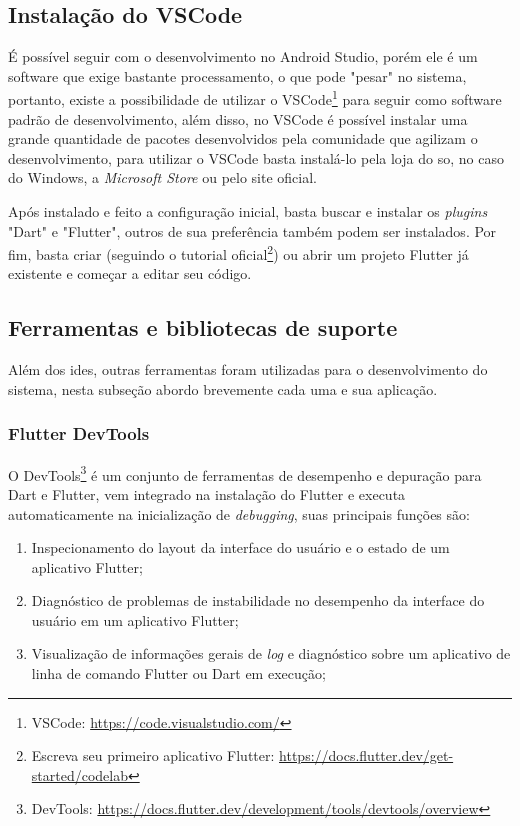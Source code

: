 \subsection{Instalação do VSCode}\label{ssec:instalacao_vscode}
É possível seguir com o desenvolvimento no Android Studio, porém ele é um software que exige bastante processamento, o que pode "pesar" no sistema, portanto, existe a possibilidade de utilizar o VSCode\footnote{\label{vscode}VSCode: \url{https://code.visualstudio.com/}} para seguir como software padrão de desenvolvimento, além disso, no VSCode é possível instalar uma grande quantidade de pacotes desenvolvidos pela comunidade que agilizam o desenvolvimento, para utilizar o VSCode basta instalá-lo pela loja do \ac{so}, no caso do Windows, a \textit{Microsoft Store} ou pelo site oficial. 

Após instalado e feito a configuração inicial, basta buscar e instalar os \textit{plugins} "Dart" e "Flutter", outros de sua preferência também podem ser instalados. Por fim, basta criar (seguindo o tutorial oficial\footnote{\label{create_app}Escreva seu primeiro aplicativo Flutter: \url{https://docs.flutter.dev/get-started/codelab}}) ou abrir um projeto Flutter já existente e começar a editar seu código.

\subsection{Ferramentas e bibliotecas de suporte}\label{ssec:ferramentas}
Além dos \acp{ide}, outras ferramentas foram utilizadas para o desenvolvimento do sistema, nesta subseção abordo brevemente cada uma e sua aplicação.
\subsubsection{Flutter DevTools}\label{sssec:flutter_devtools}
O DevTools\footnote{\label{dev_tools}DevTools: \url{https://docs.flutter.dev/development/tools/devtools/overview}} é um conjunto de ferramentas de desempenho e depuração para Dart e Flutter, vem integrado na instalação do Flutter e executa automaticamente na inicialização de \textit{debugging}, suas principais funções são:

 \begin{enumerate}
   \item Inspecionamento do layout da interface do usuário e o estado de um aplicativo Flutter;
   \item Diagnóstico de problemas de instabilidade no desempenho da interface do usuário em um aplicativo Flutter;
   \item Visualização de informações gerais de \textit{log} e diagnóstico sobre um aplicativo de linha de comando Flutter ou Dart em execução;
 \end{enumerate}


